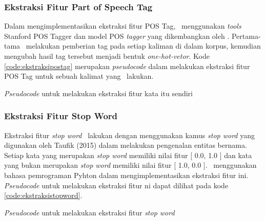 \subsubsection{Ekstraksi Fitur Part of Speech Tag}
Dalam mengimplementasikan ekstraksi fitur POS Tag, \saya~menggunakan \textit{tools} Stanford POS Tagger dan model POS \textit{tagger} yang dikembangkan oleh \cite{dinakaramani2014designing}. Pertama-tama \saya~melakukan pemberian tag pada setiap kaliman di dalam korpus, kemudian mengubah hasil tag tersebut menjadi bentuk \textit{one-hot-vetor}. Kode \ref{code:ekstraksipostag} merupakan \textit{pseudocode} dalam melakukan ekstraksi fitur POS Tag untuk sebuah kalimat yang \saya~lakukan.

\begin{kode}
	
	
	\caption{\textit{Pseudocode} untuk melakukan ekstraksi fitur kata itu sendiri}
	\label{code:ekstraksipostag}
\end{kode}

\subsubsection{Ekstraksi Fitur Stop Word}
Ekstraksi fitur \textit{stop word} \saya~lakukan dengan menggunakan kamus \textit{stop word} yang digunakan oleh Taufik (2015) dalam melakukan pengenalan entitas bernama. Setiap kata yang merupakan \textit{stop word} memiliki nilai fitur [ 0.0, 1.0 ] dan kata yang bukan merupakan \textit{stop word} memiliki nilai fitur [ 1.0, 0.0 ]. \Saya~menggunakan bahasa pemrograman Pyhton dalam mengimplementasikan ekstraksi fitur ini.
\textit{Pseudocode} untuk melakukan ekstraksi fitur ni dapat dilihat pada kode \ref{code:ekstraksistopword}.

\begin{kode}

	
	
	\caption{\textit{Pseudocode} untuk melakukan ekstraksi fitur \textit{stop word}}
	\label{code:ekstraksistopword}	
\end{kode}

